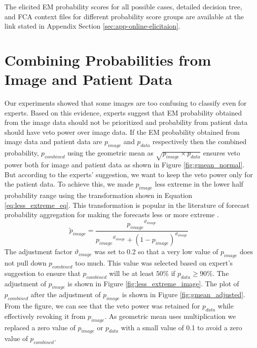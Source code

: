 The elicited EM probability scores for all possible cases, detailed decision tree, and FCA context files for different probability score groups are available at the link stated in Appendix Section \ref{sec:app-online-elicitaion}.

\section{Combining Probabilities from Image and Patient Data}\label{sec:combining_prob}
Our experiments showed that some images are too confusing to classify even for experts. Based on this evidence, experts suggest that EM probability obtained from the image data should not be prioritized and probability from patient data should have veto power over image data. If the EM probability obtained from image data and patient data are $p_{image}$ and $p_{data}$ respectively then the combined probability, $p_{combined}$ using the geometric mean as $\sqrt{p_{image} \times p_{data}}$ ensures veto power both for image and patient data as shown in Figure \ref{fig:gmean_normal}. But according to the experts’ suggestion, we want to keep the veto power only for the patient data. To achieve this, we made  $p_{image}$ less extreme in the lower half probability range using the transformation shown in Equation \ref{eq:less_extreme_eq}. This transformation is popular in the literature of forecast probability aggregation for making the forecasts less or more extreme \cite{baron2014two, karmarkar1978subjectively, shlomi2010subjective}. 
\begin{equation}
	\label{eq:less_extreme_eq}
	\tilde{p}_{image}=\frac{{p_{image}}^{\vartheta_{image}}}{{p_{image}}^{\vartheta_{image}}+{\left ( 1-p_{image} \right )}^{\vartheta_{image}}}
\end{equation}
The adjustment factor  $\vartheta_{image}$  was set to 0.2 so that a very low value of  $p_{image}$  does not pull down  $p_{combined}$  too much. This value was selected based on expert's suggestion to ensure that  $p_{combined}$  will be at least  $50\%$  if  $p_{data}\geq 90\%$. The adjustment of  $p_{image}$  is shown in Figure \ref{fig:less_extreme_image}. The plot of  $p_{combined}$  after the adjustment of  $p_{image}$  is shown in Figure \ref{fig:gmean_adjusted}. From the figure, we can see that the veto power was retained for  $p_{data}$  while effectively revoking it from  $p_{image}$. As geometric mean uses multiplication we replaced a zero value of  $p_{image}$  or  $p_{data}$  with a small value of 0.1 to avoid a zero value of  $p_{combined}$. 

